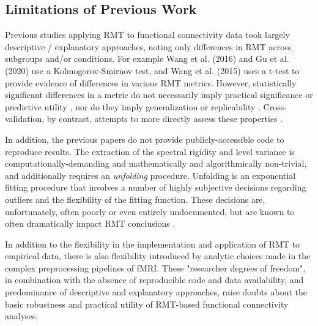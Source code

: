 \documentclass[12pt]{spieman}  %
\begin{document}
\begin{spacing}{2}
\subsection{Limitations of Previous Work}

Previous studies applying RMT to functional connectivity
data\cite{wangRandomMatrixTheory2016, wangSpectralPropertiesTemporal2015a,
matharooSpontaneousBackpainAlters2020, guRandomMatrixTheory2020} took largely
descriptive / explanatory approaches, noting only differences in RMT across
subgroups and/or conditions. For example Wang et al.
(2016)\cite{wangRandomMatrixTheory2016} and Gu et al.
(2020)\cite{guRandomMatrixTheory2020} use a Kolmogorov-Smirnov test, and Wang
et al. (2015)\cite{wangSpectralPropertiesTemporal2015a} uses a t-test to
provide evidence of differences in various RMT metrics. However, statistically
significant differences in a metric do not necessarily imply practical
significance or predictive utility \cite{loWhySignificantVariables2015}, nor do
they imply generalization or replicability \cite{amrheinEarthFlat052017}.
Cross-validation, by contrast, attempts to more directly assess these
properties \cite{yarkoniChoosingPredictionExplanation2017}.

In addition, the previous papers do not provide publicly-accessible code to
reproduce results. The extraction of the spectral rigidity and level variance
is computationally-demanding and mathematically and algorithmically
non-trivial, and additionally requires an \textit{unfolding}
procedure\cite{guhrRandommatrixTheoriesQuantum1998a, mehtaRandomMatrices2004}.
Unfolding is an exponential fitting procedure that involves a number of highly
subjective decisions regarding outliers and the flexibility of the fitting
function. These decisions are, unfortunately, often poorly or even entirely
undocumented, but are known to often dramatically impact RMT conclusions
\cite{abul-magdUnfoldingSpectrumChaotic2014,
abueleninSpectralUnfoldingChaotic2018, fossionRandommatrixSpectraTime2013,
abueleninEffectUnfoldingSpectral2012, moralesImprovedUnfoldingDetrending2011}.

In addition to the flexibility in the implementation and application of RMT to
empirical data, there is also flexibility introduced by analytic choices made
in the complex preprocessing pipelines of
fMRI\cite{parkerBenefitSliceTiming2019}. These "researcher degrees of
freedom"\cite{simmonsFalsePositivePsychologyUndisclosed2011b}, in combination
with the absence of reproducible code and data availability, and predominance
of descriptive and explanatory approaches, raise doubts about the basic
robustness and practical utility of RMT-based functional connectivity analyses.


\end{spacing}
\end{document}
